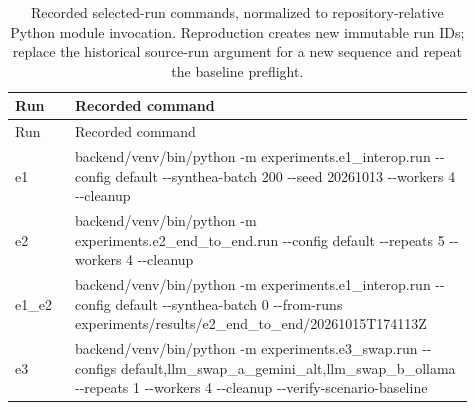 \begingroup\small\setlength{\tabcolsep}{3pt}\renewcommand{\arraystretch}{1.15}
\begin{longtable}{>{\raggedright\arraybackslash}p{0.12\linewidth}>{\raggedright\arraybackslash}p{0.79\linewidth}}
\caption{Recorded selected-run commands, normalized to repository-relative Python module invocation. Reproduction creates new immutable run IDs; replace the historical source-run argument for a new sequence and repeat the baseline preflight.}\label{sup:commands}\\\hline
Run & Recorded command \\ \hline
\endfirsthead
\hline
Run & Recorded command \\ \hline
\endhead
\hline\endfoot
\hline\endlastfoot
e1 & backend/\allowbreak{}venv/\allowbreak{}bin/\allowbreak{}python -\allowbreak{}m experiments.\allowbreak{}e1\_\allowbreak{}interop.\allowbreak{}run -\allowbreak{}-\allowbreak{}config default -\allowbreak{}-\allowbreak{}synthea-\allowbreak{}batch 200 -\allowbreak{}-\allowbreak{}seed 20261013 -\allowbreak{}-\allowbreak{}workers 4 -\allowbreak{}-\allowbreak{}cleanup \\
e2 & backend/\allowbreak{}venv/\allowbreak{}bin/\allowbreak{}python -\allowbreak{}m experiments.\allowbreak{}e2\_\allowbreak{}end\_\allowbreak{}to\_\allowbreak{}end.\allowbreak{}run -\allowbreak{}-\allowbreak{}config default -\allowbreak{}-\allowbreak{}repeats 5 -\allowbreak{}-\allowbreak{}workers 4 -\allowbreak{}-\allowbreak{}cleanup \\
e1\_\allowbreak{}e2 & backend/\allowbreak{}venv/\allowbreak{}bin/\allowbreak{}python -\allowbreak{}m experiments.\allowbreak{}e1\_\allowbreak{}interop.\allowbreak{}run -\allowbreak{}-\allowbreak{}config default -\allowbreak{}-\allowbreak{}synthea-\allowbreak{}batch 0 -\allowbreak{}-\allowbreak{}from-\allowbreak{}runs experiments/\allowbreak{}results/\allowbreak{}e2\_\allowbreak{}end\_\allowbreak{}to\_\allowbreak{}end/\allowbreak{}20261015T174113Z \\
e3 & backend/\allowbreak{}venv/\allowbreak{}bin/\allowbreak{}python -\allowbreak{}m experiments.\allowbreak{}e3\_\allowbreak{}swap.\allowbreak{}run -\allowbreak{}-\allowbreak{}configs default,llm\_\allowbreak{}swap\_\allowbreak{}a\_\allowbreak{}gemini\_\allowbreak{}alt,llm\_\allowbreak{}swap\_\allowbreak{}b\_\allowbreak{}ollama -\allowbreak{}-\allowbreak{}repeats 1 -\allowbreak{}-\allowbreak{}workers 4 -\allowbreak{}-\allowbreak{}cleanup -\allowbreak{}-\allowbreak{}verify-\allowbreak{}scenario-\allowbreak{}baseline \\

\end{longtable}
